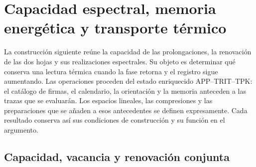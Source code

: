 \section{Capacidad espectral, memoria energética y transporte térmico}
\label{sec:ii-ter27-antecedentes}

La construcción siguiente reúne la capacidad de las prolongaciones, la
renovación de las dos hojas y sus realizaciones espectrales. Su objeto es
determinar qué conserva una lectura térmica cuando la fase retorna y el
registro sigue aumentando. Las operaciones proceden del estado enriquecido
APP--TRIT--TPK: el catálogo de firmas, el calendario, la orientación y la
memoria anteceden a las trazas que se evaluarán. Los espacios lineales,
las compresiones y las preparaciones que se añaden a esos antecedentes
se definen expresamente. Cada resultado conserva así sus condiciones de
construcción y su función en el argumento.

\subsection{Capacidad, vacancia y renovación conjunta}
\label{sec:ii-ter27-capacidad}

